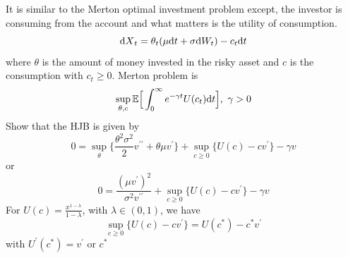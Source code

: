 \documentclass[11pt]{book}
\newcommand{\dt}{\text{\normalfont d}t}
\newcommand{\dX}{\text{\normalfont d}X}
\newcommand{\dW}{\text{\normalfont d}W}
\begin{document}
\begin{ex}
    {}
    It is similar to the Merton optimal investment problem except, the investor is consuming from the account and what matters is the utility of consumption.
    \begin{equation}
        {\dX}_t=\theta_t(\mu {{\dt}}+ \sigma \dW_t)-c_t{{\dt}}
    \end{equation}
    where $\theta$ is the amount of money invested in the risky asset and $c$ is the consumption with $c_t\ge0$.
    Merton problem is 
    \begin{equation}
        \sup_{\theta,c}\mathbb{E}\Big[\int_0^\infty e^{-\gamma t}U(c_t){\dt}\Big], ~\gamma>0
    \end{equation}
    Show that the HJB is given by
    \begin{equation}
        0= \sup_{\theta}\bigg\{\frac{\theta^2\sigma^2}{2}v^{\prime\prime}+\theta\mu v^\prime\bigg\}+\sup_{c\ge0}\Big\{U(c)-cv^\prime\Big\}-\gamma v
    \end{equation}
    or 
    \begin{equation}\label{eqn:HJB_consumption}
        0=\frac{(\mu v^\prime)^2}{\sigma^2 v^{\prime\prime}}+\sup_{c\ge0}\Big\{U(c)-cv^\prime\Big\}-\gamma v
    \end{equation}
For $U(c)=\frac{x^{1-\lambda}}{1-\lambda}$, with $\lambda\in(0,1)$, we have
\begin{equation}
    \sup_{c\ge0}\Big\{U(c)-cv^\prime\Big\}=U(c^*)-c^*v^\prime
\end{equation}
with $U^\prime(c^*)=v^\prime$ or $c^*$
\end{ex}

\end{document}
